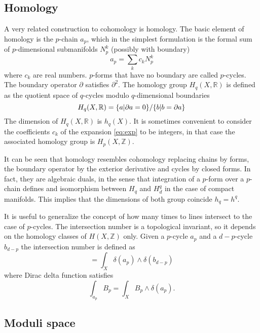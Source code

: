 \subsection{Homology}

A very related construction to cohomology is homology.
The basic element of homology is the $p$-chain $a_p$, which in the simplest formulation is the
formal sum of $p$-dimensional submanifolds $N_p^k$ (possibly with boundary)
\begin{equation}
  a_p = \sum_k c_k N_p^k
  \label{eq:exp}
\end{equation}
where $c_k$ are real numbers.
$p$-forms that have no boundary are called $p$-cycles. The boundary operator $\partial$ satisfies $\partial^2$.
The homology group $H_q(X,\mathbb R)$ is defined as the quotient space of $q$-cycles modulo $q$-dimensional
boundaries
\begin{equation}
  H_q(X,\mathbb R) =\qty{a| \partial a=0}/\qty{b|b=\partial a}
\end{equation}
The dimension of $H_q(X,\mathbb R)$ is $h_q(X)$.
It is sometimes convenient to consider the coefficients $c_k$ of the expansion \eqref{eq:exp} to
be integers, in that case the associated homology group is $H_p(X,\mathbb Z)$.

It can be seen that homology resembles cohomology replacing chains by forms, the boundary operator
by the exterior derivative and cycles by closed forms.
In fact, they are algebraic duals, in the sense that integration of a $p$-form over a $p$-chain
defines and isomorphism between $H_q$ and $H^q_d$ in the case of compact manifolds. 
This implies that the dimensions of both group coincide $h_q=h^q$.

It is useful to generalize the concept of how many times to lines intersect to the case of
$p$-cycles.
The intersection number is a topological invariant, so it depends on the homology
classes of $H(X,\mathbb Z)$ only.
Given a $p$-cycle $a_p$ and a $d-p$-cycle $b_{d-p}$ the intersection number is defined as
\begin{equation}
  [a_p] [b_{d-p}] = \int_X \delta(a_p)\wedge \delta(b_{d-p})
\end{equation}
where Dirac delta function satisfies
\begin{equation}
  \int_{a_p} B_p = \int_X B_p \wedge \delta(a_p).
\end{equation}

\subsection{Moduli space}

